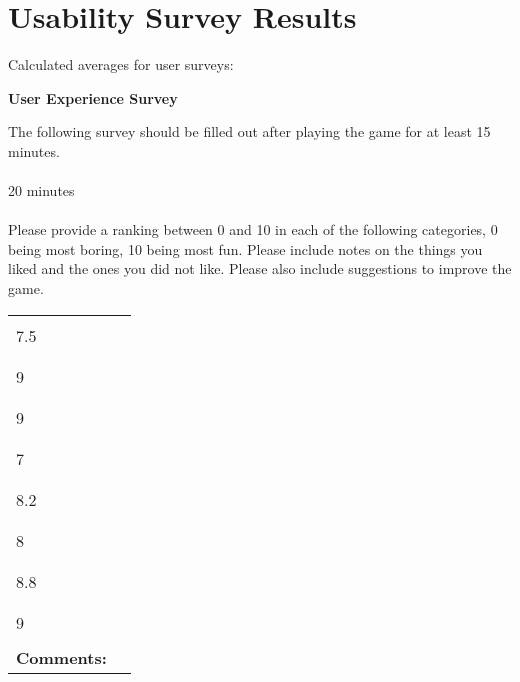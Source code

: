 \documentclass[12pt, titlepage]{article}
\begin{document}
\section{Usability Survey Results}
Calculated averages for user surveys:
\begin{mdframed}[linewidth=1pt]
\begin{center}
{\bf \large User Experience Survey}\\[\baselineskip]
\end{center}
\noindent The following survey should be filled out after playing the game for at least 15 minutes.\\
\\
 20 minutes
\\
\\
\noindent Please provide a ranking between 0 and 10 in each of the following categories, 0 being most boring, 10 being most fun.  Please include notes on the things you liked and the ones you did not like. Please also include suggestions to improve the game.\\[\baselineskip]
\noindent \begin{tabularx}{\textwidth}{@{}p{3.5cm}X@{}}
\noindent {\bf Entertainment:}\\
7.5\\
\\
\noindent {\bf Friendliness:}\\
9\\
\\
\noindent {\bf Ease of use:}\\
9\\
\\
\noindent {\bf Game Difficulty:}\\
7\\
\\
\noindent {\bf Appearance:}\\
8.2\\
\\
\noindent {\bf Sounds:}\\
8\\
\\
\noindent {\bf Song:}\\
8.8\\
\\
\noindent {\bf High Score:}\\
9\\
\\
{\bf Comments:} & \\[5\baselineskip]
\end{tabularx}
\end{mdframed}




\end{document}
